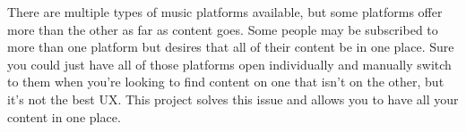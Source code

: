 There are multiple types of music platforms available, but some platforms offer more than the other as far as content goes. Some people may be subscribed to more than one platform but desires that all of their content be in one place. Sure you could just have all of those platforms open individually and manually switch to them when you’re looking to find content on one that isn’t on the other, but it’s not the best UX. This project solves this issue and allows you to have all your content in one place.